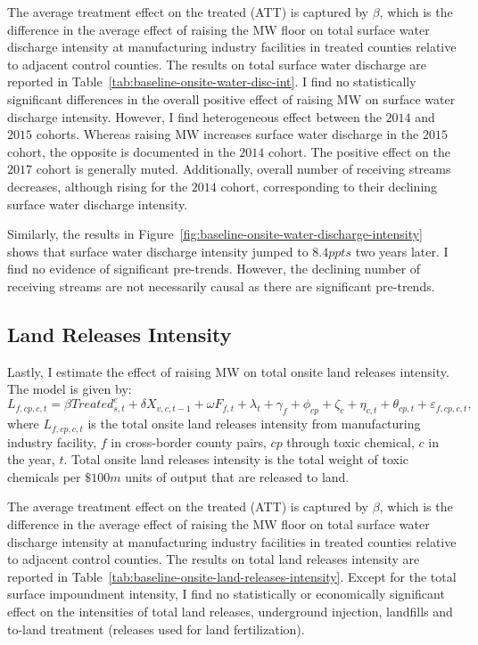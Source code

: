 \documentclass[authoryear, preprint, twocolumn, 1p]{elsarticle}
\begin{document}
    The average treatment effect on the treated (ATT) is captured by $\beta$, which is the difference in the average effect of raising the MW floor on total surface water discharge intensity at manufacturing industry facilities in treated counties relative to adjacent control counties. The results on total surface water discharge are reported in Table~\ref{tab:baseline-onsite-water-disc-int}. I find no statistically significant differences in the overall positive effect of raising MW on surface water discharge intensity. However, I find heterogeneous effect between the $2014$ and $2015$ cohorts. Whereas raising MW increases surface water discharge in the $2015$ cohort, the opposite is documented in the $2014$ cohort. The positive effect on the $2017$ cohort is generally muted. Additionally, overall number of receiving streams decreases, although rising for the $2014$ cohort, corresponding to their declining surface water discharge intensity.

    Similarly, the results in Figure~\ref{fig:baseline-onsite-water-discharge-intensity} shows that surface water discharge intensity jumped to $8.4ppts$ two years later. I find no evidence of significant pre-trends. However, the declining number of receiving streams are not necessarily causal as there are significant pre-trends.
    

    \subsection{Land Releases Intensity}\label{subsec:land-releases-intensity}
    Lastly, I estimate the effect of raising MW on total onsite land releases intensity. The model is given by:
    \begin{equation}
        L_{f,cp,c,t} = \beta Treated_{s,t}^e + \delta X_{v,c,t-1} + \omega F_{f,t} + \lambda_{t} + \gamma_{f} + \phi_{cp} + \zeta_{c} + \eta_{c,t} + \theta_{cp,t} + \varepsilon_{f,cp,c,t},\label{eq:baseline-onsite-land-releases-intensity}
    \end{equation}
    where $L_{f,cp,c,t}$ is the total onsite land releases intensity from manufacturing industry facility, $f$ in cross-border county pairs, $cp$ through toxic chemical, $c$ in the year, $t$. Total onsite land releases intensity is the total weight of toxic chemicals per $\$100m$ units of output that are released to land.
    

    The average treatment effect on the treated (ATT) is captured by $\beta$, which is the difference in the average effect of raising the MW floor on total surface water discharge intensity at manufacturing industry facilities in treated counties relative to adjacent control counties. The results on total land releases intensity are reported in Table~\ref{tab:baseline-onsite-land-releases-intensity}. Except for the total surface impoundment intensity, I find no statistically or economically significant effect on the intensities of total land releases, underground injection, landfills and to-land treatment (releases used for land fertilization).
\end{document}
